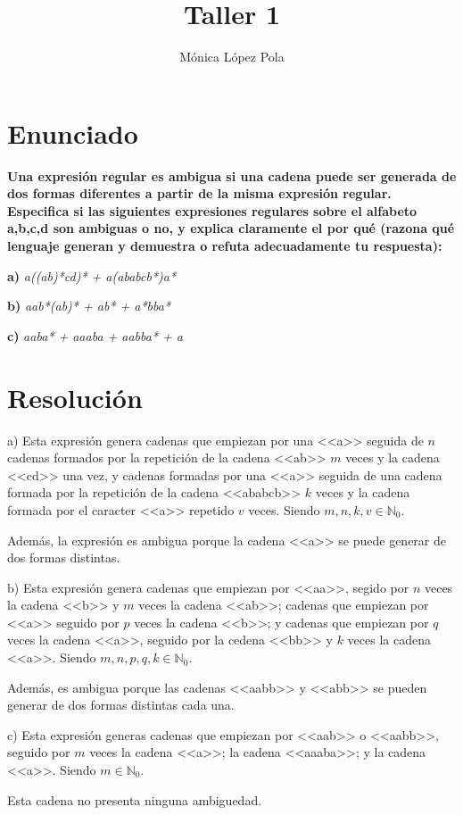 \documentclass{article}
\title{Taller 1}
\author{Mónica López Pola}
\begin{document}
\maketitle

\section*{Enunciado}

\textbf{Una expresión regular es ambigua si una cadena puede ser generada de dos formas diferentes a partir de la misma expresión regular. Especifica si las siguientes expresiones regulares sobre el alfabeto {a,b,c,d} son ambiguas o no, y explica claramente el por qué (razona qué lenguaje generan y demuestra o refuta adecuadamente tu respuesta):}

\textbf{a)}
\textit{a((ab)*cd)* + a(ababcb*)a*}

\textbf{b)}
\textit{aab*(ab)* + ab* + a*bba*}

\textbf{c)}
\textit{aaba* + aaaba + aabba* + a}

\section*{Resolución}

a) Esta expresión genera cadenas que empiezan por una <<a>> seguida de $n$ cadenas formados por la repetición de la cadena <<ab>> $m$ veces y la cadena <<cd>> una vez, y cadenas formadas por una <<a>> seguida de una cadena formada por la repetición de la cadena <<ababcb>> $k$ veces y la cadena formada por el caracter <<a>> repetido $v$ veces.
Siendo $m, n, k, v\in\mathbb{N}_{0}$.

Además, la expresión es ambigua porque la cadena <<a>> se puede generar de dos formas distintas.

\hspace{1cm}

b) Esta expresión genera cadenas que empiezan por <<aa>>, segido por $n$ veces la cadena <<b>> y $m$ veces la cadena <<ab>>; cadenas que empiezan por <<a>> seguido por $p$ veces la cadena <<b>>; y cadenas que empiezan por $q$ veces la cadena <<a>>, seguido por la cedena <<bb>> y $k$ veces la cadena <<a>>. Siendo $m, n, p, q, k\in\mathbb{N}_{0}$.

Además, es ambigua porque las cadenas <<aabb>> y <<abb>> se pueden generar de dos formas distintas cada una.

\hspace{1cm}

c) Esta expresión generas cadenas que empiezan por <<aab>> o <<aabb>>, seguido por $m$ veces la cadena <<a>>; la cadena <<aaaba>>; y la cadena <<a>>. Siendo $m\in\mathbb{N}_{0}$.

Esta cadena no presenta ninguna ambiguedad.
\end{document}
